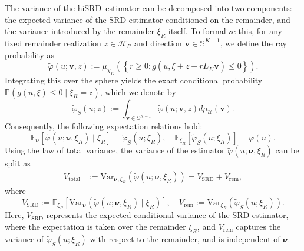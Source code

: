 \documentclass[%
onefignum,onetabnum]{siamonline250211}
\newcommand{\bbE}{\mathbb E}
\newcommand{\bbP}{\mathbb P}
\newcommand{\bbS}{\mathbb S}
\newcommand{\cU}{\mathcal U} \newcommand{\cV}{\mathcal V}
\newcommand{\hiSRD}{{\sc hiSRD}}
\begin{document}
The variance of the \hiSRD\ estimator can be decomposed into two components: the expected variance of the SRD estimator conditioned on the remainder, and the variance introduced by the remainder $\xi_R$ itself. To formalize this, for any fixed remainder realization $z\in\mathscr{H}_R$ and direction $\boldsymbol{v}\in\bbS^{K-1}$, we define the ray probability as
\begin{equation*}
    \tilde{\varphi}(u;\boldsymbol{v},z) := \mu_{\chi_K}\left(\left\{r\geq 0: g(u,\bar{\xi}+z+r L_K\boldsymbol{v})\leq 0\right\}\right).
\end{equation*}
Integrating this over the sphere yields the exact conditional probability $\bbP(g(u,\xi)\leq 0 \mid \xi_R=z)$, which we denote by
\begin{equation*}
    \tilde{\varphi}_S(u;z) := \int_{\boldsymbol{v}\in\bbS^{K-1}}\tilde{\varphi}(u;\boldsymbol{v},z) d\mu_{\cU} (\boldsymbol{v}).
\end{equation*}
Consequently, the following expectation relations hold:
\begin{equation*}
    \bbE_{\boldsymbol{\nu}}[\tilde{\varphi}(u;\boldsymbol{\nu},\xi_R) \mid \xi_R] = \tilde{\varphi}_S(u;\xi_R),\quad \bbE_{\xi_R}[\tilde{\varphi}_S(u;\xi_R)] = \varphi(u).
\end{equation*}
Using the law of total variance, the variance of the estimator $\tilde{\varphi}(u;\boldsymbol{\nu},\xi_R)$ can be split as
\begin{equation*}
    \begin{aligned}
        V_{\text{total}}&:= \mathrm{Var}_{\boldsymbol{\nu},\xi_R}(\tilde{\varphi}(u;\boldsymbol{\nu},\xi_R)) =  V_{\text{SRD}} + V_{\text{rem}},
    \end{aligned}
\end{equation*}
    where
\begin{equation}\label{eq:VSRD}
        V_{\text{SRD}} := \bbE_{\xi_R}[\mathrm{Var}_{\boldsymbol{\nu}}(\tilde{\varphi}(u;\boldsymbol{\nu},\xi_R) \mid \xi_R)], \quad V_{\text{rem}}:= \mathrm{Var}_{\xi_R}(\tilde{\varphi}_S(u;\xi_R)).
\end{equation}
Here, 
$V_{\text{SRD}}$
represents the expected conditional variance of the SRD estimator, where the expectation is taken over the remainder $\xi_R$, and $V_{\text{rem}}$
captures the variance of $\tilde{\varphi}_S(u;\xi_R)$ with respect to the remainder, and is independent of $\boldsymbol{\nu}$.
\end{document}
